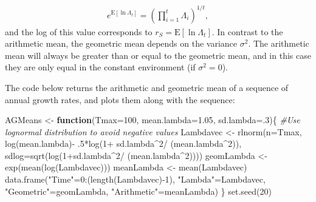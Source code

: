 \documentclass[
]{book}
\newenvironment{Shaded}{\begin{snugshade}}{\end{snugshade}}
\newcommand{\AttributeTok}[1]{\textcolor[rgb]{0.77,0.63,0.00}{#1}}
\newcommand{\CommentTok}[1]{\textcolor[rgb]{0.56,0.35,0.01}{\textit{#1}}}
\newcommand{\ControlFlowTok}[1]{\textcolor[rgb]{0.13,0.29,0.53}{\textbf{#1}}}
\newcommand{\DecValTok}[1]{\textcolor[rgb]{0.00,0.00,0.81}{#1}}
\newcommand{\FloatTok}[1]{\textcolor[rgb]{0.00,0.00,0.81}{#1}}
\newcommand{\FunctionTok}[1]{\textcolor[rgb]{0.00,0.00,0.00}{#1}}
\newcommand{\NormalTok}[1]{#1}
\newcommand{\OtherTok}[1]{\textcolor[rgb]{0.56,0.35,0.01}{#1}}
\newcommand{\SpecialCharTok}[1]{\textcolor[rgb]{0.00,0.00,0.00}{#1}}
\newcommand{\StringTok}[1]{\textcolor[rgb]{0.31,0.60,0.02}{#1}}
\begin{document}
\begin{align} 
e^{\text{E}[\ln\Lambda_t]}=\left(\prod_{i=1}^t \Lambda_i \right)^{1/t},
\end{align}
and the log of this value corresponds to \(r_S=\text{E}[\ln\Lambda_t]\). In contrast to the arithmetic mean, the geometric mean depends on the variance \(\sigma^2\). The arithmetic mean will always be greater than or equal to the geometric mean, and in this case they are only equal in the constant environment (if \(\sigma^2=0\)).

The code below returns the arithmetic and geometric mean of a sequence of annual growth rates, and plots them along with the sequence:

\begin{Shaded}
\begin{Highlighting}[]
\NormalTok{AGMeans }\OtherTok{\textless{}{-}} \ControlFlowTok{function}\NormalTok{(}\AttributeTok{Tmax=}\DecValTok{100}\NormalTok{, }\AttributeTok{mean.lambda=}\FloatTok{1.05}\NormalTok{, }\AttributeTok{sd.lambda=}\NormalTok{.}\DecValTok{3}\NormalTok{)\{}
  \CommentTok{\#Use lognormal distribution to avoid negative values}
\NormalTok{  Lambdavec }\OtherTok{\textless{}{-}} \FunctionTok{rlnorm}\NormalTok{(}\AttributeTok{n=}\NormalTok{Tmax, }
                      \FunctionTok{log}\NormalTok{(mean.lambda)}\SpecialCharTok{{-}}
\NormalTok{                        .}\DecValTok{5}\SpecialCharTok{*}\FunctionTok{log}\NormalTok{(}\DecValTok{1}\SpecialCharTok{+}\NormalTok{ sd.lambda}\SpecialCharTok{\^{}}\DecValTok{2}\SpecialCharTok{/}
\NormalTok{                                 (mean.lambda}\SpecialCharTok{\^{}}\DecValTok{2}\NormalTok{)), }
                      \AttributeTok{sdlog=}\FunctionTok{sqrt}\NormalTok{(}\FunctionTok{log}\NormalTok{(}\DecValTok{1}\SpecialCharTok{+}\NormalTok{sd.lambda}\SpecialCharTok{\^{}}\DecValTok{2}\SpecialCharTok{/}
\NormalTok{                                       (mean.lambda}\SpecialCharTok{\^{}}\DecValTok{2}\NormalTok{))))}
\NormalTok{   geomLambda }\OtherTok{\textless{}{-}} \FunctionTok{exp}\NormalTok{(}\FunctionTok{mean}\NormalTok{(}\FunctionTok{log}\NormalTok{(Lambdavec)))}
\NormalTok{   meanLambda }\OtherTok{\textless{}{-}} \FunctionTok{mean}\NormalTok{(Lambdavec)}
  \FunctionTok{data.frame}\NormalTok{(}\StringTok{"Time"}\OtherTok{=}\DecValTok{0}\SpecialCharTok{:}\NormalTok{(}\FunctionTok{length}\NormalTok{(Lambdavec)}\SpecialCharTok{{-}}\DecValTok{1}\NormalTok{), }
             \StringTok{"Lambda"}\OtherTok{=}\NormalTok{Lambdavec,}
             \StringTok{"Geometric"}\OtherTok{=}\NormalTok{geomLambda, }
             \StringTok{"Arithmetic"}\OtherTok{=}\NormalTok{meanLambda)}
\NormalTok{\}}
\FunctionTok{set.seed}\NormalTok{(}\DecValTok{20}\NormalTok{) }


\end{Highlighting}
\end{Shaded}
\end{document}
